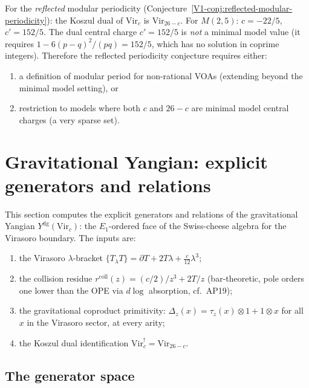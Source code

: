 \documentclass[11pt]{article}
\begin{document}
\begin{remark}
For the \emph{reflected} modular periodicity
(Conjecture~\ref*{V1-conj:reflected-modular-periodicity}):
the Koszul dual of $\mathrm{Vir}_c$ is $\mathrm{Vir}_{26-c}$.
For $M(2,5)$: $c = -22/5$, $c' = 152/5$.
The dual central charge $c' = 152/5$ is \emph{not} a minimal
model value (it requires $1 - 6(p-q)^2/(pq) = 152/5$, which
has no solution in coprime integers).  Therefore the reflected
periodicity conjecture requires either:
\begin{enumerate}[nosep]
\item a definition of modular period for non-rational VOAs
  (extending beyond the minimal model setting), or
\item restriction to models where both $c$ and $26-c$ are
  minimal model central charges (a very sparse set).
\end{enumerate}
\end{remark}


\section{Gravitational Yangian: explicit generators and relations}
\label{sec:gravitational-yangian-explicit}

This section computes the explicit generators and relations of the
gravitational Yangian $Y^{\mathrm{dg}}(\mathrm{Vir}_c)$: the
$E_1$-ordered face of the Swiss-cheese algebra for the Virasoro
boundary.  The inputs are:
\begin{enumerate}[label=(\arabic*)]
\item the Virasoro $\lambda$-bracket
  $\{T{}_\lambda T\} = \partial T + 2T\lambda + \frac{c}{12}\lambda^3$;
\item the collision residue
  $r^{\mathrm{coll}}(z) = (c/2)/z^3 + 2T/z$
  (bar-theoretic, pole orders one lower than the OPE via $d\log$
  absorption, cf.~AP19);
\item the gravitational coproduct primitivity:
  $\Delta_z(x) = \tau_z(x) \otimes 1 + 1 \otimes x$
  for all $x$ in the Virasoro sector, at every arity;
\item the Koszul dual identification
  $\mathrm{Vir}_c^! = \mathrm{Vir}_{26-c}$.
\end{enumerate}

\subsection{The generator space}
\end{document}
